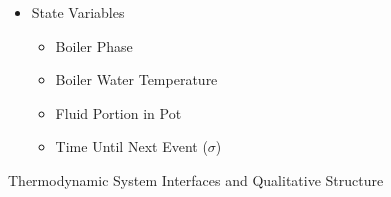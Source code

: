\documentclass[10pt]{article}
\begin{document}
\begin{figure}[H]
{\begin{minipage}{0.98\textwidth}
\begin{minipage}{0.48\textwidth}
\begin{small}
\begin{itemize}
  \begin{itemize}
  \item Water Volume
  \item Heating Element Power
  \item Specific Heat Capacity of Water
  \item Fluid Density
  \end{itemize}
\item State Variables
  \begin{itemize}
  \item Boiler Phase
  \item Boiler Water Temperature
  \item Fluid Portion in Pot
  \item Time Until Next Event ($\sigma$)
  \end{itemize}
\end{itemize}
\end{small}
\vfill
\end{minipage}
\end{minipage}}
\caption{Thermodynamic System Interfaces and Qualitative Structure}
\label{fig:IOFO1}
\end{figure}

\vspace{0.2cm}
\end{document}
